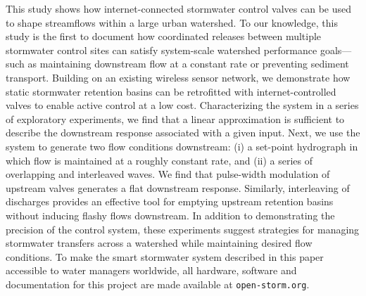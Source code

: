 This study shows how internet-connected stormwater control valves can be used to shape streamflows within a large urban watershed. To our knowledge, this study is the first to document how coordinated releases between multiple stormwater control sites can satisfy system-scale watershed performance goals---such as maintaining downstream flow at a constant rate or preventing sediment transport. Building on an existing wireless sensor network, we demonstrate how static stormwater retention basins can be retrofitted with internet-controlled valves to enable active control at a low cost. 
Characterizing the system in a series of exploratory experiments,
we find that a linear approximation is sufficient to describe the downstream response associated with a given input. Next, we use the system to generate two flow conditions downstream: (i) a set-point hydrograph in which flow is maintained at a roughly constant rate, and (ii) a series of overlapping and interleaved waves. We find that pulse-width modulation of upstream valves generates a flat downstream response. Similarly, interleaving of discharges provides an effective tool for emptying upstream retention basins without inducing flashy flows downstream. In addition to demonstrating the precision of the control system, these experiments suggest strategies for managing stormwater transfers across a watershed while maintaining desired flow conditions. To make the smart stormwater system described in this paper accessible to water managers worldwide, all hardware, software and documentation for this project are made available at \texttt{open-storm.org}. 
